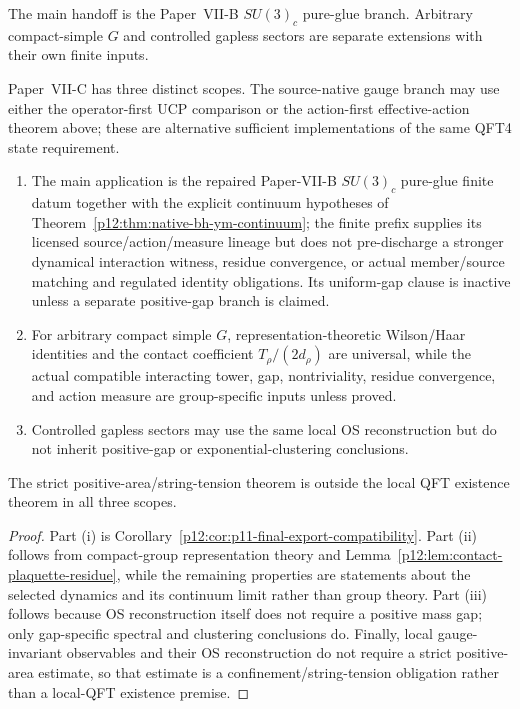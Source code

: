\documentclass[12pt,a4paper]{article}
\begin{document}
The main handoff is the Paper~VII-B \(SU(3)_c\) pure-glue branch.  Arbitrary compact-simple \(G\) and controlled gapless sectors are separate extensions with their own finite inputs.

\begin{theorem}
\label{p12:thm:tier4-scope-closure}
Paper~VII-C has three distinct scopes.  The source-native gauge branch may use either the operator-first UCP comparison or the action-first effective-action theorem above; these are alternative sufficient implementations of the same QFT4 state requirement.
\begin{enumerate}[label=(\roman*)]
\item The main application is the repaired Paper-VII-B \(SU(3)_c\) pure-glue finite datum together with the explicit continuum hypotheses of Theorem~\ref{p12:thm:native-bh-ym-continuum}; the finite prefix supplies its licensed source/action/measure lineage but does not pre-discharge a stronger dynamical interaction witness, residue convergence, or actual member/source matching and regulated identity obligations.  Its uniform-gap clause is inactive unless a separate positive-gap branch is claimed.
\item For arbitrary compact simple \(G\), representation-theoretic Wilson/Haar identities and the contact coefficient \(T_\rho/(2d_\rho)\) are universal, while the actual compatible interacting tower, gap, nontriviality, residue convergence, and action measure are group-specific inputs unless proved.
\item Controlled gapless sectors may use the same local OS reconstruction but do not inherit positive-gap or exponential-clustering conclusions.
\end{enumerate}
The strict positive-area/string-tension theorem is outside the local QFT existence theorem in all three scopes.
\end{theorem}
\begin{proof}
Part (i) is Corollary~\ref{p12:cor:p11-final-export-compatibility}.  Part (ii) follows from compact-group representation theory and Lemma~\ref{p12:lem:contact-plaquette-residue}, while the remaining properties are statements about the selected dynamics and its continuum limit rather than group theory.  Part (iii) follows because OS reconstruction itself does not require a positive mass gap; only gap-specific spectral and clustering conclusions do.  Finally, local gauge-invariant observables and their OS reconstruction do not require a strict positive-area estimate, so that estimate is a confinement/string-tension obligation rather than a local-QFT existence premise.
\end{proof}
\end{document}
